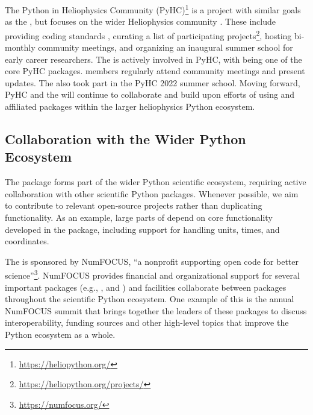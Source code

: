 The Python in Heliophysics Community (PyHC)\footnote{\url{https://heliopython.org/}} \citep{barnum2022python} is a project with similar goals as the \sunpyproj, but focuses on the wider Heliophysics community \citep{https://doi.org/10.1029/2018JA025877}.
These include providing coding standards \citep{annex_a_2018_2529131}, curating a list of participating projects\footnote{\url{https://heliopython.org/projects/}}, hosting bi-monthly community meetings, and organizing an inaugural summer school for early career researchers.
The \sunpyproj is actively involved in PyHC, with \sunpypkg being one of the core PyHC packages.
\sunpyproj members regularly attend community meetings and present updates.
The \sunpyproj also took part in the PyHC 2022 summer school.
Moving forward, PyHC and the \sunpyproj will continue to collaborate and build upon efforts of using \sunpypkg and affiliated packages within the larger heliophysics Python ecosystem.

\subsection{Collaboration with the Wider Python Ecosystem}
\label{ssec:collaboration-with-the-wider-python-ecosystem}

The \sunpypkg package forms part of the wider Python scientific ecosystem, requiring active collaboration with other scientific Python packages.
Whenever possible, we aim to contribute to relevant open-source projects rather than duplicating functionality.
As an example, large parts of \sunpypkg depend on core functionality developed in the \astropypkg package, including support for handling units, times, and coordinates.

The \sunpyproj is sponsored by NumFOCUS, \enquote{a nonprofit supporting open code for better science}\footnote{\url{https://numfocus.org/}}.
NumFOCUS provides financial and organizational support for several important packages (e.g., ,  and ) and facilities collaborate between packages throughout the scientific Python ecosystem.
One example of this is the annual NumFOCUS summit that brings together the leaders of these packages to discuss interoperability, funding sources and other high-level topics that improve the Python ecosystem as a whole.

